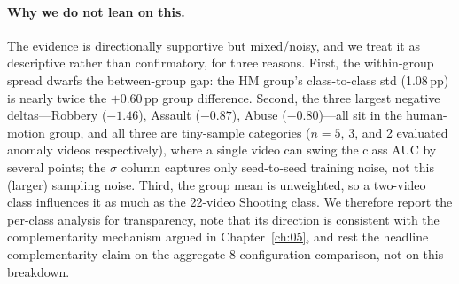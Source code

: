 \paragraph{Why we do not lean on this.} The evidence is
directionally supportive but mixed/noisy, and we treat it as descriptive
rather than confirmatory, for three reasons. First, the within-group spread dwarfs the
between-group gap: the HM group's class-to-class std (1.08\,pp) is nearly
twice the $+0.60$\,pp group difference. Second, the three largest negative
deltas---Robbery ($-1.46$), Assault ($-0.87$), Abuse ($-0.80$)---all sit in
the human-motion group, and all three are tiny-sample categories ($n=5$, 3,
and 2 evaluated anomaly videos respectively), where a single video can swing
the class AUC by several points; the $\sigma$ column captures only
seed-to-seed training noise, not this (larger) sampling noise. Third, the
group mean is unweighted, so a two-video class influences it as much as the
22-video Shooting class. We therefore report the per-class analysis for
transparency, note that its direction is consistent with the
complementarity mechanism argued in Chapter~\ref{ch:05}, and rest the
headline complementarity claim on the aggregate 8-configuration comparison,
not on this breakdown.
